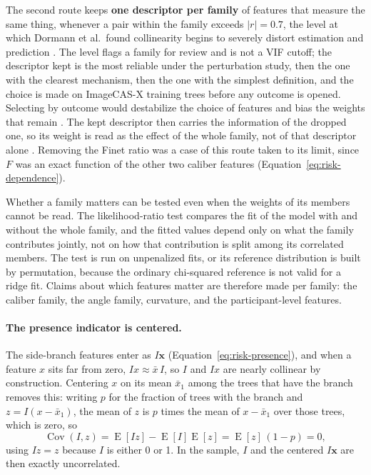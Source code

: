 The second route keeps \textbf{one descriptor per family} of features that measure the same thing, whenever a pair within the family exceeds $\lvert r \rvert = 0.7$, the level at which Dormann et al.\ found collinearity begins to severely distort estimation and prediction \cite{dormann2013collinearity}.
The level flags a family for review and is not a VIF cutoff; the descriptor kept is the most reliable under the perturbation study, then the one with the clearest mechanism, then the one with the simplest definition, and the choice is made on ImageCAS-X training trees before any outcome is opened.
Selecting by outcome would destabilize the choice of features and bias the weights that remain \cite{dormann2013collinearity}.
The kept descriptor then carries the information of the dropped one, so its weight is read as the effect of the whole family, not of that descriptor alone \cite{dormann2013collinearity}.
Removing the Finet ratio was a case of this route taken to its limit, since $F$ was an exact function of the other two caliber features (Equation~\ref{eq:risk-dependence}).

Whether a family matters can be tested even when the weights of its members cannot be read.
The likelihood-ratio test compares the fit of the model with and without the whole family, and the fitted values depend only on what the family contributes jointly, not on how that contribution is split among its correlated members.
The test is run on unpenalized fits, or its reference distribution is built by permutation, because the ordinary chi-squared reference is not valid for a ridge fit.
Claims about which features matter are therefore made per family: the caliber family, the angle family, curvature, and the participant-level features.

\paragraph{The presence indicator is centered.}
The side-branch features enter as $I\mathbf{x}$ (Equation~\ref{eq:risk-presence}), and when a feature $x$ sits far from zero, $Ix \approx \bar{x}\,I$, so $I$ and $Ix$ are nearly collinear by construction.
Centering $x$ on its mean $\bar{x}_1$ among the trees that have the branch removes this: writing $p$ for the fraction of trees with the branch and $z = I(x - \bar{x}_1)$, the mean of $z$ is $p$ times the mean of $x - \bar{x}_1$ over those trees, which is zero, so
\begin{equation}
  \operatorname{Cov}(I, z) = \operatorname{E}[Iz] - \operatorname{E}[I]\operatorname{E}[z] = \operatorname{E}[z]\,(1 - p) = 0,
  \label{eq:risk-center}
\end{equation}
using $Iz = z$ because $I$ is either 0 or 1.
In the sample, $I$ and the centered $I\mathbf{x}$ are then exactly uncorrelated.

